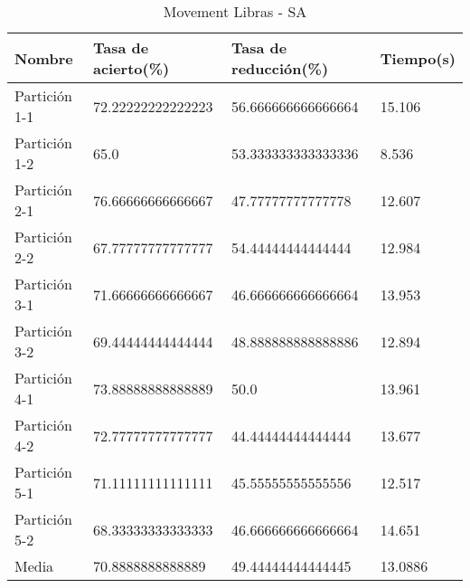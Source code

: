 \begin{table}[H]
	\centering
	\caption{Movement Libras - SA}
	\label{MLIB-SA}
	\begin{tabular}{l|lll}
		Nombre        & Tasa de acierto(\%) & Tasa de reducción(\%) & Tiempo(s) \\ \hline
		Partición 1-1 & 72.22222222222223   & 56.666666666666664    & 15.106    \\
		Partición 1-2 & 65.0                & 53.333333333333336    & 8.536     \\
		Partición 2-1 & 76.66666666666667   & 47.77777777777778     & 12.607    \\
		Partición 2-2 & 67.77777777777777   & 54.44444444444444     & 12.984    \\
		Partición 3-1 & 71.66666666666667   & 46.666666666666664    & 13.953    \\
		Partición 3-2 & 69.44444444444444   & 48.888888888888886    & 12.894    \\
		Partición 4-1 & 73.88888888888889   & 50.0                  & 13.961    \\
		Partición 4-2 & 72.77777777777777   & 44.44444444444444     & 13.677    \\
		Partición 5-1 & 71.11111111111111   & 45.55555555555556     & 12.517    \\
		Partición 5-2 & 68.33333333333333   & 46.666666666666664    & 14.651    \\ \hline
		Media         & 70.8888888888889    & 49.44444444444445     & 13.0886  
	\end{tabular}
\end{table}